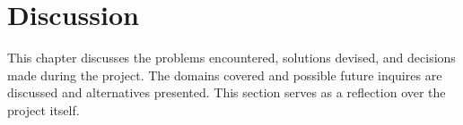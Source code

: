 \chapter{Discussion}
This chapter discusses the problems encountered, solutions devised, and decisions made during the project. The domains covered and possible future inquires are discussed and alternatives presented. This section serves as a reflection over the project itself.


%